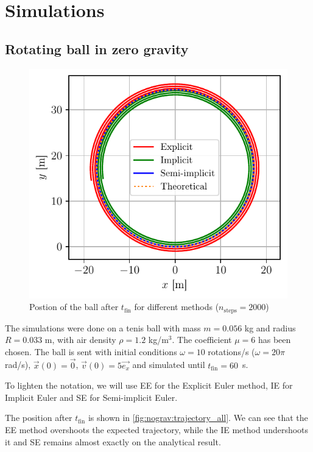 \section{Simulations}

\subsection{Rotating ball in zero gravity}

\begin{figure}
    \centering
    \includegraphics[width=0.85\linewidth]{figures/nograv_trajectory_all.pdf}
    \caption{Postion of the ball after $t_\textrm{fin}$ for different methods ($n_\textrm{steps} = 2000$)}
    \label{fig:nograv:trajectory_all}
    \vspace*{-1cm}
\end{figure}
The simulations were done on a tenis ball with mass $m = 0.056$ kg and radius $R = 0.033$ m, with air density $\rho = 1.2$ kg/m$^3$. The coefficient $\mu = 6$ has been chosen. The ball is sent with initial conditions $\omega = 10$ rotations/s ($\omega = 20\pi$ rad/s), $\vec{x}(0) = \vec{0}$, $\vec{v}(0) = 5 \vec{e_x}$ and simulated until \mbox{$t_\textrm{fin} = 60$ s}.

To lighten the notation, we will use EE for the Explicit Euler method, IE for Implicit Euler and SE for Semi-implicit Euler.

The position after $t_\textrm{fin}$ is shown in \autoref{fig:nograv:trajectory_all}. We can see that the EE method overshoots the expected trajectory, while the IE method undershoots it and SE remains almost exactly on the analytical result.

